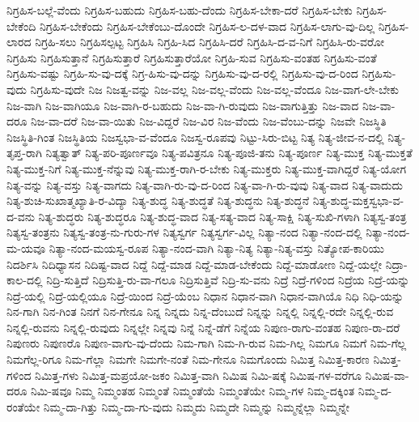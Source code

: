 {ನಿಗ್ರಹಿಸ-ಬಲ್ಲೆ-ವೆಂದು
ನಿಗ್ರಹಿಸ-ಬಹುದು
ನಿಗ್ರಹಿಸ-ಬಹು-ದೆಂದು
ನಿಗ್ರಹಿಸ-ಬೇಕಾ-ದರೆ
ನಿಗ್ರಹಿಸ-ಬೇಕು
ನಿಗ್ರಹಿಸ-ಬೇಕೆಂದಿ
ನಿಗ್ರಹಿಸ-ಬೇಕೆಂದು
ನಿಗ್ರಹಿಸ-ಬೇಕೆಂಬು-ದೊಂದೇ
ನಿಗ್ರಹಿಸ-ಲ-ದಳ-ವಾದ
ನಿಗ್ರಹಿಸ-ಲಾಗು-ವು-ದಿಲ್ಲ
ನಿಗ್ರಹಿಸ-ಲಾರದ
ನಿಗ್ರಹಿ-ಸಲು
ನಿಗ್ರಹಿಸಲ್ಪಟ್ಟ
ನಿಗ್ರಹಿಸಿ
ನಿಗ್ರಹಿ-ಸಿದ
ನಿಗ್ರಹಿಸಿ-ದರೆ
ನಿಗ್ರಹಿಸಿ-ದ-ವ-ನಿಗೆ
ನಿಗ್ರಹಿಸಿ-ರು-ವರೋ
ನಿಗ್ರಹಿಸು
ನಿಗ್ರಹಿಸುತ್ತಾನೆ
ನಿಗ್ರಹಿಸುತ್ತಾರೆ
ನಿಗ್ರಹಿಸುತ್ತಾರೆಯೋ
ನಿಗ್ರಹಿ-ಸುವ
ನಿಗ್ರಹಿಸು-ವಂತಹ
ನಿಗ್ರಹಿಸು-ವಂತೆ
ನಿಗ್ರಹಿಸು-ವಷ್ಟು
ನಿಗ್ರಹಿ-ಸು-ವು-ದಕ್ಕೆ
ನಿಗ್ರ-ಹಿಸು-ವು-ದನ್ನು
ನಿಗ್ರಹಿಸು-ವು-ದ-ರಲ್ಲಿ
ನಿಗ್ರಹಿಸು-ವು-ದ-ರಿಂದ
ನಿಗ್ರಹಿಸು-ವುದು
ನಿಗ್ರಹಿಸು-ವುದೇ
ನಿಜ
ನಿಜತ್ವ-ವನ್ನು
ನಿಜ-ವಲ್ಲ
ನಿಜ-ವಲ್ಲ-ವೆಂದು
ನಿಜ-ವಲ್ಲ-ವೆಂದೂ
ನಿಜ-ವಾಗ-ಲೇ-ಬೇಕು
ನಿಜ-ವಾಗಿ
ನಿಜ-ವಾಗಿಯೂ
ನಿಜ-ವಾಗಿ-ರ-ಬಹುದು
ನಿಜ-ವಾ-ಗಿ-ರುವುದು
ನಿಜ-ವಾಗುತ್ತಿತ್ತು
ನಿಜ-ವಾದ
ನಿಜ-ವಾ-ದರೂ
ನಿಜ-ವಾ-ದರೆ
ನಿಜ-ವಾ-ಯಿತು
ನಿಜ-ವಿದ್ದರೆ
ನಿಜ-ವಿರ
ನಿಜ-ವೆಂದು
ನಿಜ-ವೆಂಬು-ದನ್ನು
ನಿಜವೇ
ನಿಜಸ್ಥಿತಿ
ನಿಜಸ್ಥಿತಿ-ಗಿಂತ
ನಿಜಸ್ಥಿತಿಯ
ನಿಜಸ್ವಭಾ-ವ-ವೆಂದೂ
ನಿಜಸ್ವ-ರೂಪವು
ನಿಟ್ಟು-ಸಿರು-ಬಿಟ್ಟ
ನಿತ್ಯ
ನಿತ್ಯ-ಜೀವ-ನ-ದಲ್ಲಿ
ನಿತ್ಯ-ತೃಪ್ತ-ರಾಗಿ
ನಿತ್ಯತ್ವಾತ್
ನಿತ್ಯ-ಪರಿ-ಪೂರ್ಣವೂ
ನಿತ್ಯ-ಪವಿತ್ರನೂ
ನಿತ್ಯ-ಪೂಜಿ-ತನು
ನಿತ್ಯ-ಪೂರ್ಣ
ನಿತ್ಯ-ಮುಕ್ತ
ನಿತ್ಯ-ಮುಕ್ತತೆ
ನಿತ್ಯ-ಮುಕ್ತ-ನಿಗೆ
ನಿತ್ಯ-ಮುಕ್ತ-ನೆನ್ನುವು
ನಿತ್ಯ-ಮುಕ್ತ-ರಾಗಿ-ರ-ಬೇಕು
ನಿತ್ಯ-ಮುಕ್ತರು
ನಿತ್ಯ-ಮುಕ್ತ-ವಾಗಿದ್ದರೆ
ನಿತ್ಯ-ಯೋಗ
ನಿತ್ಯ-ವನ್ನು
ನಿತ್ಯ-ವಸ್ತು
ನಿತ್ಯ-ವಾಗದು
ನಿತ್ಯ-ವಾಗಿ-ರು-ವು-ದ-ರಿಂದ
ನಿತ್ಯ-ವಾ-ಗಿ-ರು-ವುವು
ನಿತ್ಯ-ವಾದ
ನಿತ್ಯ-ವಾದುದು
ನಿತ್ಯ-ಶುಚಿ-ಸುಖಾತ್ಮಖ್ಯಾತಿ-ರ-ವಿದ್ಯಾ
ನಿತ್ಯ-ಶುದ್ಧ
ನಿತ್ಯ-ಶುದ್ಧತೆ
ನಿತ್ಯ-ಶುದ್ಧನು
ನಿತ್ಯ-ಶುದ್ಧನೆ
ನಿತ್ಯ-ಶುದ್ಧ-ಮಕ್ತಸ್ವಭಾ-ವ-ದ-ವನು
ನಿತ್ಯ-ಶುದ್ಧರು
ನಿತ್ಯ-ಶುದ್ಧರೂ
ನಿತ್ಯ-ಶುದ್ಧ-ವಾದ
ನಿತ್ಯ-ಸತ್ಯ-ವಾದ
ನಿತ್ಯ-ಸಾಕ್ಷಿ
ನಿತ್ಯ-ಸುಖಿ-ಗಳಾಗಿ
ನಿತ್ಯಸ್ವ-ತಂತ್ರ
ನಿತ್ಯಸ್ವ-ತಂತ್ರನು
ನಿತ್ಯಸ್ವ-ತಂತ್ರ-ನು-ಗುರು-ಗಳ
ನಿತ್ಯಸ್ವರ್ಗ
ನಿತ್ಯಸ್ವರ್ಗ-ವಿಲ್ಲ
ನಿತ್ಯಾ-ನಂದ
ನಿತ್ಯಾ-ನಂದ-ದಲ್ಲಿ
ನಿತ್ಯಾ-ನಂದ-ಮ-ಯವೂ
ನಿತ್ಯಾ-ನಂದ-ಮಯಸ್ವ-ರೂಪ
ನಿತ್ಯಾ-ನಂದ-ವಾಗಿ
ನಿತ್ಯಾ-ನಿತ್ಯ
ನಿತ್ಯಾ-ನಿತ್ಯ-ವಸ್ತು
ನಿತ್ಯೋಪ-ಕಾರಿಯು
ನಿದರ್ಶಿಸಿ
ನಿದಿಧ್ಯಾಸನ
ನಿದಿಷ್ಟ-ವಾದ
ನಿದ್ದೆ
ನಿದ್ದೆ-ಮಾಡ
ನಿದ್ದೆ-ಮಾಡ-ಬೇಕೆಂದು
ನಿದ್ದೆ-ಮಾಡೋಣ
ನಿದ್ದೆ-ಯಲ್ಲೇ
ನಿದ್ರಾ-ಕಾಲ-ದಲ್ಲಿ
ನಿದ್ರಿ-ಸುತ್ತಿದೆ
ನಿದ್ರಿಸುತ್ತಿ-ರು-ವಾ-ಗಲೂ
ನಿದ್ರಿಸುತ್ತಿವೆ
ನಿದ್ರಿ-ಸು-ವನು
ನಿದ್ರೆ
ನಿದ್ರೆ-ಗಳಿಂದ
ನಿದ್ರೆಯ
ನಿದ್ರೆ-ಯನ್ನು
ನಿದ್ರೆ-ಯಲ್ಲಿ
ನಿದ್ರೆ-ಯಲ್ಲಿಯೂ
ನಿದ್ರೆ-ಯಿಂದ
ನಿದ್ರೆ-ಯೆಂಬ
ನಿಧಾನ
ನಿಧಾನ-ವಾಗಿ
ನಿಧಾನ-ವಾಗಿಯೊ
ನಿಧಿ
ನಿಧಿ-ಯನ್ನು
ನಿನ-ಗಾಗಿ
ನಿನ-ಗಿಂತ
ನಿನಗೆ
ನಿನ-ಗೇನೂ
ನಿನ್ನ
ನಿನ್ನದು
ನಿನ್ನ-ದೆಂಬುದೆ
ನಿನ್ನನ್ನು
ನಿನ್ನಲ್ಲಿ
ನಿನ್ನಲ್ಲಿ-ರದೇ
ನಿನ್ನಲ್ಲಿ-ರುವ
ನಿನ್ನಲ್ಲಿ-ರುವನು
ನಿನ್ನಲ್ಲಿ-ರುವುದು
ನಿನ್ನಲ್ಲೇ
ನಿನ್ನವು
ನಿನ್ನೆ
ನಿನ್ನೆ-ಡೆಗೆ
ನಿನ್ನೆಯ
ನಿಪುಣ-ರಾಗು-ವಂತಹ
ನಿಪುಣ-ರಾ-ದರೆ
ನಿಪುಣರು
ನಿಪುಣರೊ
ನಿಪುಣ-ವಾಗು-ವು-ದೆಂದು
ನಿಮ-ಗಾಗಿ
ನಿಮ-ಗಿ-ರುವ
ನಿಮ-ಗಿಲ್ಲ
ನಿಮಗೂ
ನಿಮಗೆ
ನಿಮ-ಗೆಲ್ಲ
ನಿಮಗೆಲ್ಲ-ರಿಗೂ
ನಿಮ-ಗೆಲ್ಲಾ
ನಿಮಗೇ
ನಿಮಗೇ-ನಂತೆ
ನಿಮ-ಗೇನೂ
ನಿಮಗೊಂದು
ನಿಮಿತ್ತ
ನಿಮಿತ್ತ-ಕಾರಣ
ನಿಮಿತ್ತ-ಗಳಿಂದ
ನಿಮಿತ್ತ-ಗಳು
ನಿಮಿತ್ತ-ಮಪ್ರಯೋ-ಜಕಂ
ನಿಮಿತ್ತ-ವಾಗಿ
ನಿಮಿಷ
ನಿಮಿ-ಷಕ್ಕೆ
ನಿಮಿಷ-ಗಳ-ವರೆಗೂ
ನಿಮಿಷ-ವಾ-ದರೂ
ನಿಮಿ-ಷವೂ
ನಿಮ್ಮ
ನಿಮ್ಮಂತಹ
ನಿಮ್ಮಂತೆ
ನಿಮ್ಮಂತೆಯೆ
ನಿಮ್ಮಂತೆಯೇ
ನಿಮ್ಮ-ಗಳ
ನಿಮ್ಮ-ದಕ್ಕಿಂತ
ನಿಮ್ಮ-ದ-ರಂತೆಯೇ
ನಿಮ್ಮ-ದಾ-ಗಿತ್ತು
ನಿಮ್ಮ-ದಾ-ಗು-ವುದು
ನಿಮ್ಮದು
ನಿಮ್ಮದೇ
ನಿಮ್ಮನ್ನು
ನಿಮ್ಮನ್ನೆಲ್ಲಾ
ನಿಮ್ಮನ್ನೇ
}

